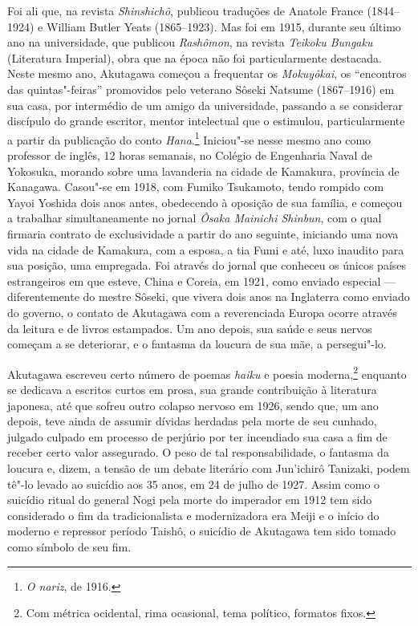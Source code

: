 Foi ali que, na revista \textit{Shinshichô}, publicou traduções de
Anatole France (1844--1924) e William Butler Yeats (1865--1923).
Mas foi em 1915, durante seu último ano na universidade, que publicou
\textit{Rashômon}, na revista \textit{Teikoku Bungaku}
(Literatura Imperial), obra que na época não foi particularmente
destacada. Neste mesmo ano, Akutagawa começou a frequentar os 
\textit{Mokuyôkai}, os ``encontros das quintas"-feiras'' promovidos pelo
veterano  Sôseki Natsume (1867--1916) em sua casa, por intermédio de um
amigo da universidade, passando a se considerar discípulo do grande
escritor, mentor intelectual que o estimulou, particularmente a partir
da publicação do conto \textit{Hana}.\footnote{\textit{O nariz}, de 1916.} Iniciou"-se nesse
mesmo ano como professor de inglês, 12 horas semanais, no Colégio de
Engenharia Naval de Yokosuka, morando sobre uma lavanderia na cidade de
Kamakura, província de Kanagawa. Casou"-se em 1918, com Fumiko
Tsukamoto, tendo rompido com Yayoi Yoshida dois anos antes, obedecendo
à oposição de sua família, e começou a trabalhar simultaneamente no
jornal \textit{Ôsaka Mainichi Shinbun}, com o qual firmaria contrato de
exclusividade a partir do ano seguinte, iniciando uma nova vida na
cidade de Kamakura, com a esposa, a tia Fumi e até, luxo inaudito para
sua posição, uma empregada. Foi através do jornal que conheceu os
únicos países estrangeiros em que esteve, China e Coreia, em 1921, como
enviado especial --- diferentemente do mestre Sôseki, que vivera dois
anos na Inglaterra como enviado do governo, o contato de Akutagawa com
a reverenciada Europa ocorre através da leitura e de livros estampados.
Um ano depois, sua saúde e seus nervos começam a se deteriorar, e o
fantasma da loucura de sua mãe, a persegui"-lo.

Akutagawa escreveu certo número de poemas \textit{haiku} e 
poesia moderna,\footnote{Com métrica ocidental, rima ocasional, tema político,
formatos fixos.} enquanto se dedicava a escritos curtos em prosa, sua
grande contribuição à literatura japonesa, até que sofreu outro colapso
nervoso em 1926, sendo que, um ano depois, teve ainda de assumir
dívidas herdadas pela morte de seu cunhado, julgado culpado em processo
de perjúrio por ter incendiado sua casa a fim de receber certo valor
assegurado. O peso de tal responsabilidade, o fantasma da loucura e,
dizem, a tensão de um debate literário com Jun'ichirô Tanizaki, podem
tê"-lo levado ao suicídio aos 35 anos, em 24 de julho de 1927. Assim
como o suicídio ritual do general Nogi pela morte do imperador em 1912
tem sido considerado o fim da tradicionalista e modernizadora era Meiji
e o início do moderno e repressor período Taishô, o suicídio de
Akutagawa tem sido tomado como símbolo de seu fim.

